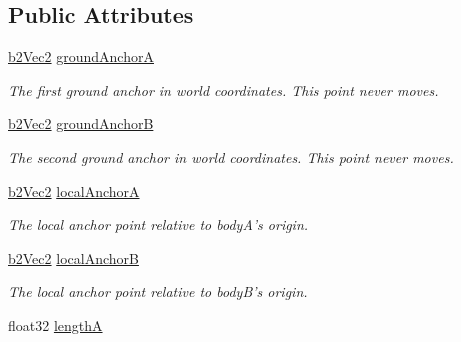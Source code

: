\subsection*{Public Attributes}
\begin{DoxyCompactItemize}
\item 
\hypertarget{structb2_pulley_joint_def_aae77c020ce4629ab9e03560e28aa853d}{\hyperlink{structb2_vec2}{b2\-Vec2} \hyperlink{structb2_pulley_joint_def_aae77c020ce4629ab9e03560e28aa853d}{ground\-Anchor\-A}}\label{structb2_pulley_joint_def_aae77c020ce4629ab9e03560e28aa853d}

\begin{DoxyCompactList}\small\item\em The first ground anchor in world coordinates. This point never moves. \end{DoxyCompactList}\item 
\hypertarget{structb2_pulley_joint_def_aa412b9f3bffd1fb69ace14f9b3e03b82}{\hyperlink{structb2_vec2}{b2\-Vec2} \hyperlink{structb2_pulley_joint_def_aa412b9f3bffd1fb69ace14f9b3e03b82}{ground\-Anchor\-B}}\label{structb2_pulley_joint_def_aa412b9f3bffd1fb69ace14f9b3e03b82}

\begin{DoxyCompactList}\small\item\em The second ground anchor in world coordinates. This point never moves. \end{DoxyCompactList}\item 
\hypertarget{structb2_pulley_joint_def_ad7677a4ad02a6e7cb8699fc5012eac3e}{\hyperlink{structb2_vec2}{b2\-Vec2} \hyperlink{structb2_pulley_joint_def_ad7677a4ad02a6e7cb8699fc5012eac3e}{local\-Anchor\-A}}\label{structb2_pulley_joint_def_ad7677a4ad02a6e7cb8699fc5012eac3e}

\begin{DoxyCompactList}\small\item\em The local anchor point relative to body\-A's origin. \end{DoxyCompactList}\item 
\hypertarget{structb2_pulley_joint_def_aed3f9c9f5f4145ceb32e7e164de73144}{\hyperlink{structb2_vec2}{b2\-Vec2} \hyperlink{structb2_pulley_joint_def_aed3f9c9f5f4145ceb32e7e164de73144}{local\-Anchor\-B}}\label{structb2_pulley_joint_def_aed3f9c9f5f4145ceb32e7e164de73144}

\begin{DoxyCompactList}\small\item\em The local anchor point relative to body\-B's origin. \end{DoxyCompactList}\item 
\hypertarget{structb2_pulley_joint_def_a51d945882c1d7a78af2b0e9ffb31a33b}{float32 \hyperlink{structb2_pulley_joint_def_a51d945882c1d7a78af2b0e9ffb31a33b}{length\-A}}\label{structb2_pulley_joint_def_a51d945882c1d7a78af2b0e9ffb31a33b}


\end{DoxyCompactItemize}
